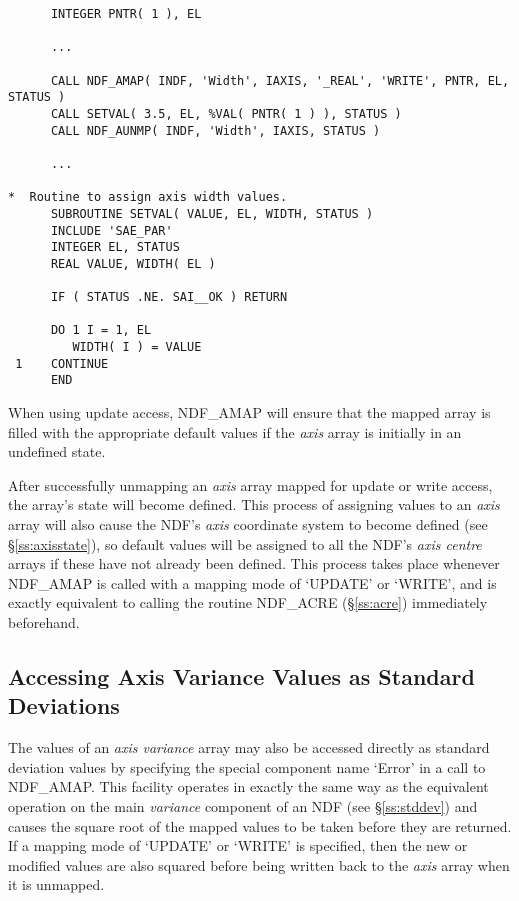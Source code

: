 \documentclass[twoside,11pt]{article}
\newcommand{\htmlref}[2]{#1}
\newcommand{\xlabel}[1]{}
\newcommand{\st}[1]{{\em{#1}}}
\begin{document}
\small
\begin{verbatim}
      INTEGER PNTR( 1 ), EL

      ...

      CALL NDF_AMAP( INDF, 'Width', IAXIS, '_REAL', 'WRITE', PNTR, EL, STATUS )
      CALL SETVAL( 3.5, EL, %VAL( PNTR( 1 ) ), STATUS )
      CALL NDF_AUNMP( INDF, 'Width', IAXIS, STATUS )

      ...

*  Routine to assign axis width values.
      SUBROUTINE SETVAL( VALUE, EL, WIDTH, STATUS )
      INCLUDE 'SAE_PAR'
      INTEGER EL, STATUS
      REAL VALUE, WIDTH( EL )

      IF ( STATUS .NE. SAI__OK ) RETURN

      DO 1 I = 1, EL
         WIDTH( I ) = VALUE
 1    CONTINUE
      END
\end{verbatim}
\normalsize

When using update access, NDF\_AMAP will ensure that the mapped array is
filled with the appropriate default values if the \st{axis\/} array is
initially in an undefined state. 

After successfully unmapping an \st{axis\/} array mapped for update or
write access, the array's state will become defined. 
This process of assigning values to an \st{axis\/} array will also cause
the NDF's \st{axis\/} coordinate system to become defined (see
\S\ref{ss:axisstate}), so default values will be assigned to all the NDF's
\st{axis centre\/} arrays if these have not already been defined. 
This process takes place whenever NDF\_AMAP is called with a mapping mode of
`UPDATE' or `WRITE', and is exactly equivalent to calling the routine
\htmlref{NDF\_ACRE}{NDF_ACRE} (\S\ref{ss:acre}) immediately beforehand. 

\subsection{\xlabel{accessing_axis_variance_values_as_standard_deviations}\label{ss:axisstddev}Accessing Axis Variance Values as Standard Deviations}

The values of an \st{axis variance\/} array may also be accessed directly
as standard deviation values by specifying the special component name
`Error' in a call to \htmlref{NDF\_AMAP}{NDF_AMAP}. 
This facility operates in exactly the same way as the equivalent operation
on the main \st{variance\/} component of an NDF (see \S\ref{ss:stddev}) and
causes the square root of the mapped values to be taken before they are
returned. 
If a mapping mode of `UPDATE' or `WRITE' is specified, then the new or
modified values are also squared before being written back to the
\st{axis\/} array when it is unmapped.  
\end{document}
